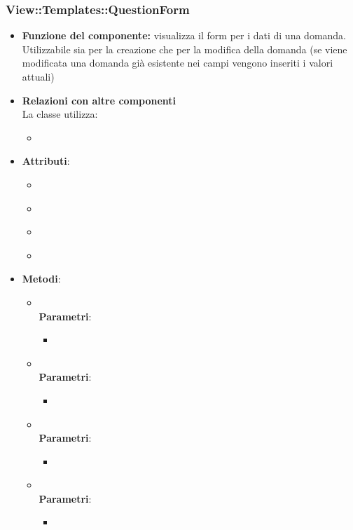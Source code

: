  \subsubsection{View::Templates::QuestionForm}
 \begin{itemize}
 \item\textbf{Funzione del componente:} visualizza il form per i dati di una domanda. Utilizzabile sia per la creazione che per la modifica della domanda (se viene modificata una domanda già esistente nei campi vengono inseriti i valori attuali)
 \item\textbf{Relazioni con altre componenti}\\
 La classe utilizza:
 	\begin{itemize}
 		\item
 	\end{itemize}
 \item\textbf{Attributi}:
 	\begin{itemize}
 		\item\code{}\\
 		\item\code{}\\
 		\item\code{}\\
 		\item\code{}\\
 	\end{itemize}
 \item\textbf{Metodi}:
 	\begin{itemize}
 		\item\code{}\\
 		\textbf{Parametri}:
 			\begin{itemize}
 				\item\code{}\\
 			\end{itemize}
 		\item\code{}\\
 		\textbf{Parametri}:
 			\begin{itemize}
 				\item\code{}\\
 			\end{itemize}
 		\item\code{}\\
 		\textbf{Parametri}:
 			\begin{itemize}
 				\item\code{}\\
 			\end{itemize}
 		\item\code{}\\
 		\textbf{Parametri}:
 			\begin{itemize}
 				\item\code{}\\
 			\end{itemize}
 	\end{itemize}
 \end{itemize}
 
